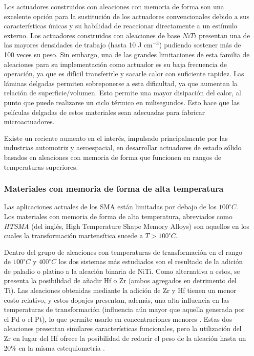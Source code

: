 \documentclass[12pt]{article}
\theoremstyle{definition}
\theoremstyle{remark}
\begin{document}
Los actuadores construidos con aleaciones con memoria de forma son una excelente opción para la sustitución de los actuadores convencionales debido a sus características únicas y su habilidad de reaccionar directamente a un estímulo externo. Los actuadores construidos con aleaciones de base $NiTi$ presentan una de las mayores densidades de trabajo (hasta 10 J cm$^{-3}$) pudiendo sostener más de 100 veces su peso. Sin embargo, una de las grandes limitaciones de esta familia de aleaciones para su implementación como actuador es su baja frecuencia de operación, ya que es difícil transferirle y sacarle calor con suficiente rapidez. Las láminas delgadas permiten sobreponerse a esta dificultad, ya que aumentan la relación de superficie/volumen. Esto permite una mayor disipación del calor, al punto que puede realizarse un ciclo térmico en milisegundos. Esto hace que las películas delgadas de estos materiales sean adecuadas para fabricar microactuadores\cite{ThinFilm}.

Existe un reciente aumento en el interés, impulsado principalmente por las industrias automotriz y aeroespacial, en desarrollar actuadores de estado sólido basados en aleaciones con memoria de forma que funcionen en rangos de temperaturas superiores.

\subsubsection{Materiales con memoria de forma de alta temperatura}

Las aplicaciones actuales de los SMA están limitadas por debajo de los $100^\circ C$. Los materiales con memoria de forma de alta temperatura, abreviados como \textit{HTSMA} (del inglés, High Temperature Shape Memory Alloys) son aquellos en los cuales la transformación martensítica sucede a $T > 100^\circ C$.

Dentro del grupo de aleaciones con temperaturas de transformación en el rango de $100^\circ C$ y $400^\circ C$ los dos sistemas más estudiados son el resultado de la adición de paladio o platino a la aleación binaria de NiTi. Como alternativa a estos, se presenta la posibilidad de añadir Hf o Zr (ambos agregados en detrimento del Ti)\cite{HTSMA}. Las aleaciones obtenidas mediante la adición de Zr y Hf tienen un menor costo relativo, y estos dopajes presentan, además, una alta influencia en las temperaturas de transformación (influencia aún mayor que aquella generada por el Pd o el Pt), lo que permite usarlo en concentraciones menores \cite{HTSMA}. Estas dos aleaciones presentan similares características funcionales, pero la utilización del Zr en lugar del Hf ofrece la posibilidad de reducir el peso de la aleación hasta un 20\% en la misma estequiometría \cite{Evirgen2013}.
\end{document}

